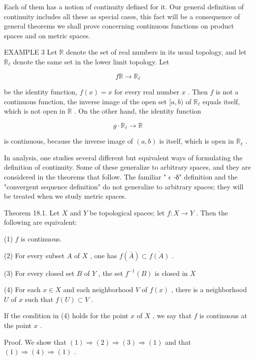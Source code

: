 \documentclass[10pt]{article}
\begin{document}
Each of them has a notion of continuity defined for it. Our general definition of continuity includes all these as special cases, this fact will be a consequence of general theorems we shall prove concerning continuous functions on product spaces and on metric spaces.

EXAMPLE 3 Let \(\mathbb{R}\) denote the set of real numbers in its usual topology, and let \({\mathbb{R}}_{\ell }\) denote the same set in the lower limit topology. Let

\[
f\mathbb{R} \rightarrow  {\mathbb{R}}_{\ell }
\]

be the identity function, \(f\left( x\right)  = x\) for every real number \(x\) . Then \(f\) is not a continuous function, the inverse image of the open set \(\lbrack a,b)\) of \({\mathbb{R}}_{\ell }\) equals itself, which is not open in \(\mathbb{R}\) . On the other hand, the identity function

\[
g \cdot  {\mathbb{R}}_{\ell } \rightarrow  \mathbb{R}
\]

is continuous, because the inverse image of \(\left( {a,b}\right)\) is itself, which is open in \({\mathbb{R}}_{\ell }\) .

In analysis, one studies several different but equivalent ways of formulating the definition of continuity. Some of these generalize to arbitrary spaces, and they are considered in the theorems that follow. The familiar " \(\epsilon\) -δ" definition and the "convergent sequence definition" do not generalize to arbitrary spaces; they will be treated when we study metric spaces.

Theorem 18.1. Let \(X\) and \(Y\) be topological spaces; let \(f : X \rightarrow  Y\) . Then the following are equivalent:

(1) \(f\) is continuous.

(2) For every subset \(A\) of \(X\) , one has \(f\left( \bar{A}\right)  \subset  \overline{f\left( A\right) }\) .

(3) For every closed set \(B\) of \(Y\) , the set \({f}^{-1}\left( B\right)\) is closed in \(X\)

(4) For each \(x \in  X\) and each neighborhood \(V\) of \(f\left( x\right)\) , there is a neighborhood \(U\) of \(x\) such that \(f\left( U\right)  \subset  V\) .

If the condition in (4) holds for the point \(x\) of \(X\) , we say that \(f\) is continuous at the point \(x\) .

Proof. We show that \(\left( 1\right)  \Rightarrow  \left( 2\right)  \Rightarrow  \left( 3\right)  \Rightarrow  \left( 1\right)\) and that \(\left( 1\right)  \Rightarrow  \left( 4\right)  \Rightarrow  \left( 1\right)\) .
\end{document}
